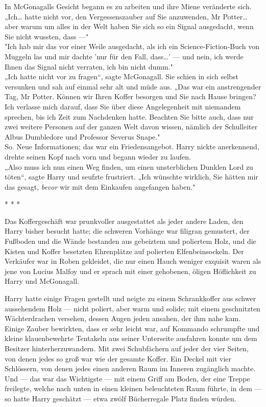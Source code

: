 {In McGonagalls Gesicht begann es zu arbeiten und ihre Miene veränderte sich. „Ich… hatte nicht vor, den Vergessenszauber auf Sie anzuwenden, Mr Potter… aber warum um alles in der Welt haben Sie sich so ein Signal ausgedacht, wenn Sie nicht wussten, dass ---"\\ "Ich hab mir das vor einer Weile ausgedacht, als ich ein Science-Fiction-Buch von Muggeln las und mir dachte 'nur für den Fall, dass…' --- und nein, ich werde Ihnen das Signal nicht verraten, ich bin nicht dumm."\\ „Ich hatte nicht vor zu fragen“, sagte McGonagall. Sie schien in sich selbst versunken und sah auf einmal sehr alt und müde aus. „Das war ein anstrengender Tag, Mr Potter. Können wir Ihren Koffer besorgen und Sie nach Hause bringen? Ich verlasse mich darauf, dass Sie über diese Angelegenheit mit niemandem sprechen, bis ich Zeit zum Nachdenken hatte. Beachten Sie bitte auch, dass nur zwei weitere Personen auf der ganzen Welt davon wissen, nämlich der Schulleiter Albus Dumbledore und Professor Severus Snape."\\ So. Neue Informationen; das war ein Friedensangebot. Harry nickte anerkennend, drehte seinen Kopf nach vorn und begann wieder zu laufen.\\ „Also muss ich nun einen Weg finden, um einen unsterblichen Dunklen Lord zu töten“, sagte Harry und seufzte frustriert. „Ich wünschte wirklich, Sie hätten mir das gesagt, \emph{bevor} wir mit dem Einkaufen angefangen haben."

* * *

Das Koffergeschäft war prunkvoller ausgestattet als jeder andere Laden, den Harry bisher besucht hatte; die schweren Vorhänge war filigran gemustert, der Fußboden und die Wände bestanden aus gebeiztem und poliertem Holz, und die Kisten und Koffer besetzten Ehrenplätze auf polierten Elfenbeinsockeln. Der Verkäufer war in Roben gekleidet, die nur einen Hauch weniger exquisit waren als jene von Lucius Malfoy und er sprach mit einer gehobenen, öligen Höflichkeit zu Harry und McGonagall.

Harry hatte einige Fragen gestellt und neigte zu einem Schrankkoffer aus schwer aussehendem Holz --- nicht poliert, aber warm und solide; mit einem geschnitzten Wächterdrachen versehen, dessen Augen jeden ansahen, der ihm nahe kam. Einige Zauber bewirkten, dass er sehr leicht war, auf Kommando schrumpfte und kleine klauenbewehrte Tentakeln aus seiner Unterseite ausfahren konnte um dem Besitzer hinterherzuwandern. Mit zwei Schubfächern auf jeder der vier Seiten, von denen jedes so groß war wie der gesamte Koffer. Ein Deckel mit vier Schlössern, von denen jedes einen anderen Raum im Inneren zugänglich machte. Und --- das war das Wichtigste --- mit einem Griff am Boden, der eine Treppe freilegte, welche nach unten in einen kleinen beleuchteten Raum führte, in dem --- so hatte Harry geschätzt --- etwa zwölf Bücherregale Platz finden würden.

}
